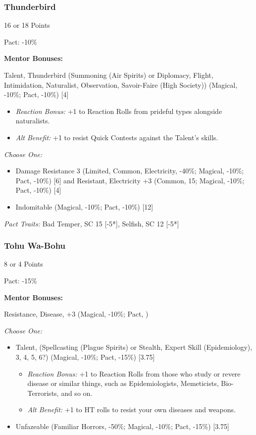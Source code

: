 \begin{multicols}{3}
	\subsubsection{Thunderbird}
	\begin{flushright}
		16 or 18 Points
	\end{flushright}
	Pact: -10\%
	
	
	\textbf{Mentor Bonuses:} 
	
	Talent, Thunderbird (Summoning (Air Spirits) or Diplomacy, Flight, Intimidation, Naturalist, Observation, Savoir-Faire (High Society)) (Magical, -10\%; Pact, -10\%) [4]
	\begin{itemize}
		\itemsep 0pt
		\item \textit{Reaction Bonus:} +1 to Reaction Rolls from prideful types alongside naturalists.
		\item \textit{Alt Benefit:} +1 to resist Quick Contests against the Talent's skills.
	\end{itemize}
	
	\textit{Choose One:}
	\begin{itemize}
		\itemsep 0pt
		\item Damage Resistance 3 (Limited, Common, Electricity, -40\%; Magical, -10\%; Pact, -10\%) [6] and Resistant, Electricity +3 (Common, 15; Magical, -10\%; Pact, -10\%) [4]
		\item Indomitable (Magical, -10\%; Pact, -10\%) [12]
	\end{itemize}
	
	\textit{Pact Traits:} Bad Temper, SC 15 [-5*], Selfish, SC 12 [-5*]
	
	\subsubsection{Tohu Wa-Bohu}
	\begin{flushright}
		8 or 4 Points
	\end{flushright}
	Pact: -15\%
	
	
	\textbf{Mentor Bonuses:} 
	
	Resistance, Disease, +3 (Magical, -10\%; Pact, )
	
	\textit{Choose One:}
	\begin{itemize}
		\itemsep 0pt
		\item Talent,  (Spellcasting (Plague Spirits) or Stealth, Expert Skill (Epidemiology), 3, 4, 5, 6?) (Magical, -10\%; Pact, -15\%) [3.75]
		\begin{itemize}
			\itemsep 0pt
			\item \textit{Reaction Bonus:} +1 to Reaction Rolls from those who study or revere disease or similar things, such as Epidemiologists, Memeticists, Bio-Terrorists, and so on.
			\item \textit{Alt Benefit:} +1 to HT rolls to resist your own diseases and weapons.
		\end{itemize}
		\item Unfazeable (Familiar Horrors, -50\%; Magical, -10\%; Pact, -15\%) [3.75]
	\end{itemize}
	

\end{multicols}
